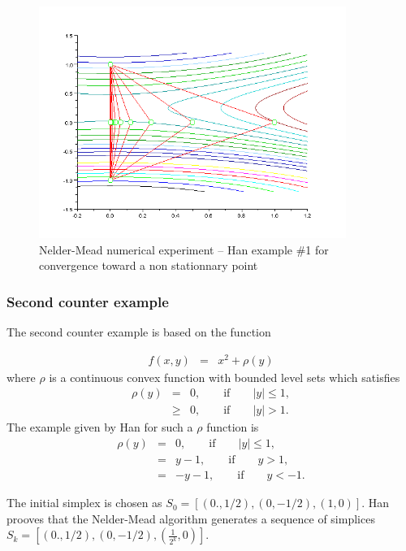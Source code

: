 \begin{figure}
\begin{center}
\includegraphics[width=10cm]{han1-history-simplex.png}
\end{center}
\caption{Nelder-Mead numerical experiment -- Han example \#1 for convergence toward
a non stationnary point}
\label{fig-nm-numexp-han1}
\end{figure}

\subsubsection{Second counter example}

The second counter example is based on the function 

\begin{eqnarray}
\label{han-function2}
f(x,y) &=& x^2 + \rho(y)
\end{eqnarray}
where $\rho$ is a continuous convex function with bounded level
sets which satisfies 
\begin{eqnarray}
\label{han-function2-rho}
\rho(y) &=& 0, \qquad \textrm{if} \qquad |y|\leq 1, \\
& \geq & 0, \qquad \textrm{if} \qquad |y|> 1.
\end{eqnarray}
The example given by Han for such a $\rho$ function is 
\begin{eqnarray}
\label{han-function2-rho2}
\rho(y) &=& 0, \qquad \textrm{if} \qquad |y|\leq 1, \\
& = & y - 1, \qquad \textrm{if} \qquad y> 1, \\
& = & -y - 1, \qquad \textrm{if} \qquad y < -1.
\end{eqnarray}

The initial simplex is chosen as $S_0 = [(0.,1/2),(0,-1/2),(1,0)]$.
Han prooves that the Nelder-Mead algorithm generates a sequence of simplices
$S_k = [(0.,1/2),(0,-1/2),(\frac{1}{2^k},0)]$.

